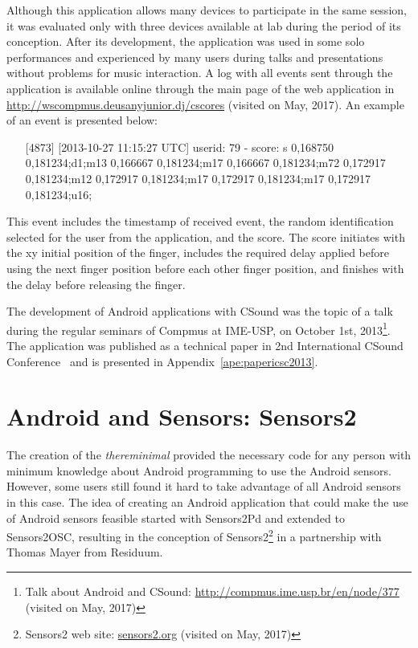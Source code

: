Although this application allows many devices to participate in the same session, it was evaluated only with three devices available at lab during the period of its conception.
After its development, the application was used in some solo performances and experienced by many users during talks and presentations without problems for music interaction.
A log with all events sent through the application is available online through the main page of the web application in \url{http://wscompmus.deusanyjunior.dj/cscores} (visited on May, 2017).
An example of an event is presented below:

\begin{itemize}\itemsep0em
	\item[] [4873] [2013-10-27 11:15:27 UTC] userid: 79 - score: s 0,168750 0,181234;d1;m13 0,166667 0,181234;m17 0,166667 0,181234;m72 0,172917 0,181234;m12 0,172917 0,181234;m17 0,172917 0,181234;m17 0,172917 0,181234;u16;
\end{itemize}

This event includes the timestamp of received event, the random identification selected for the user from the application, and the score.
The score initiates with the xy initial position of the finger, includes the required delay applied before using the next finger position before each other finger position, and finishes with the delay before releasing the finger.

The development of Android applications with CSound was the topic of a talk during the regular seminars of Compmus at IME-USP, on October 1st, 2013\footnote{Talk about Android and CSound: \url{http://compmus.ime.usp.br/en/node/377} (visited on May, 2017)}.
The application was published as a technical paper in 2nd International CSound Conference~\citep{deCarvalhoJunior2013touches} and is presented in Appendix~\ref{ape:papericsc2013}.

\section{Android and Sensors: Sensors2}
\label{apesec:appsensors2}

The creation of the \textit{thereminimal} provided the necessary code for any person with minimum knowledge about Android programming to use the Android sensors.
However, some users still found it hard to take advantage of all Android sensors in this case.
The idea of creating an Android application that could make the use of Android sensors feasible started with Sensors2Pd and extended to Sensors2OSC, resulting in the conception of Sensors2\footnote{Sensors2 web site: \url{sensors2.org} (visited on May, 2017)} in a partnership with Thomas Mayer from Residuum.

